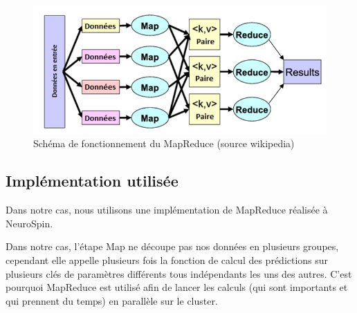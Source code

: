 \begin{figure}[htpb]
	\centering
	\includegraphics[scale = 0.5]{images/Mapreduce}
	\caption{Schéma de fonctionnement du MapReduce (source wikipedia)}
	\label{fig:MapReduce}
\end{figure}

\subsection{Implémentation utilisée}

Dans notre cas, nous utilisons une implémentation de MapReduce réalisée à NeuroSpin.

Dans notre cas, l'étape Map ne découpe pas nos données en plusieurs groupes, cependant elle appelle plusieurs fois la fonction de calcul des prédictions sur plusieurs clés de paramètres différents tous indépendants les uns des autres. C'est pourquoi MapReduce est utilisé afin de lancer les calculs (qui sont importants et qui prennent du temps) en parallèle sur le cluster. 



